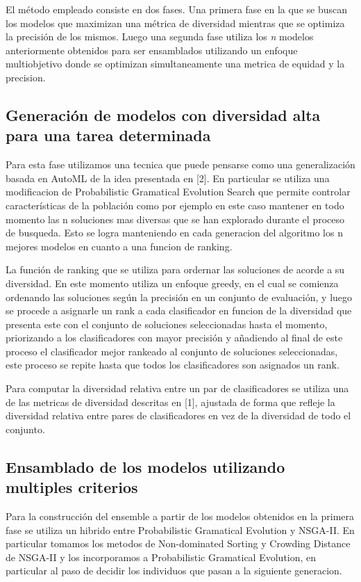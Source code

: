 \documentclass[runningheads,a4paper]{llncs}
\begin{document}
	El método empleado consiste en dos fases. Una primera fase en la que se buscan los modelos que
	maximizan una métrica de diversidad mientras que se optimiza la precisión de los mismos. Luego una
	segunda fase utiliza los \emph{n} modelos anteriormente obtenidos para ser ensamblados utilizando un
	enfoque multiobjetivo donde se optimizan simultaneamente una metrica de equidad y la precision.
	
	\subsection*{Generación de modelos con diversidad alta para una tarea determinada}
	
	Para esta fase utilizamos una tecnica que puede pensarse como una generalización basada en AutoML de
	la idea presentada en [2]. En particular se utiliza una modificacion de
	Probabilistic Gramatical Evolution Search que permite controlar características de la población como
	por ejemplo en este caso mantener en todo momento las n soluciones mas diversas que se han explorado
	durante el proceso de busqueda. Esto se logra manteniendo en cada generacion del algoritmo los n mejores
	modelos en cuanto a una funcion de ranking.
	
	La función de ranking que se utiliza para ordernar las soluciones de acorde a su diversidad. En este
	momento utiliza un enfoque greedy, en el cual se comienza ordenando las soluciones según la precisión
	en un conjunto de evaluación, y luego se procede a asignarle un rank a cada clasificador en funcion
	de la diversidad que presenta este con el conjunto de soluciones seleccionadas hasta el momento,
	priorizando a los clasificadores con mayor precisión y añadiendo al final de este proceso el
	clasificador mejor rankeado al conjunto de soluciones seleccionadas, este proceso se repite hasta
	que todos los clasificadores son asignados un rank.
	
	Para computar la diversidad relativa entre un par de clasificadores se utiliza una de las metricas
	de diversidad descritas en [1], ajustada de forma que refleje la diversidad
	relativa entre pares de clasificadores en vez de la diversidad de todo el conjunto.
	
	\subsection*{Ensamblado de los modelos utilizando multiples criterios}
	
	Para la construcción del ensemble a partir de los modelos obtenidos en la primera fase se utiliza un
	hibrido entre Probabilistic Gramatical Evolution y NSGA-II. En particular tomamos los metodos de
	Non-dominated Sorting y Crowding Distance de NSGA-II y los incorporamos a Probabilistic Gramatical
	Evolution, en particular al paso de decidir los individuos que pasan a la siguiente generacion.
	
\end{document}
